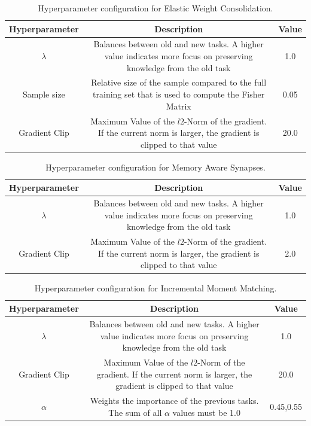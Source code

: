 \begin{table}[h!]
    \begin{tabular}{c | c c } 
        \hline
        Hyperparameter & Description & Value \\ 
        \hline 
        $\lambda$ & Balances between old and new tasks. A higher value indicates more focus
        on preserving knowledge from the old task & 1.0  \\ 
        Sample size & Relative size of the sample compared to the full training set that is used to 
        compute the Fisher Matrix & 0.05  \\ 
        Gradient Clip & Maximum Value of the $l2$-Norm of the gradient. If the current norm is larger, the
        gradient is clipped to that value & 20.0 \\ 
        \hline
    \end{tabular}
    \caption{Hyperparameter configuration for Elastic Weight Consolidation.}
    \label{fig:EWCparams}
\end{table}

\begin{table}[h!]
    \begin{tabular}{c | c c } 
        \hline
        Hyperparameter & Description & Value \\ 
        \hline 
        $\lambda$ & Balances between old and new tasks. A higher value indicates more focus
        on preserving knowledge from the old task & 1.0  \\ 
        Gradient Clip & Maximum Value of the $l2$-Norm of the gradient. If the current norm is larger, the
        gradient is clipped to that value & 2.0 \\ 
        \hline
    \end{tabular}
    \caption{Hyperparameter configuration for Memory Aware Synapses.}
    \label{fig:MASparams}
\end{table}

\begin{table}[h!]
    \begin{tabular}{c | c c } 
        \hline
        Hyperparameter & Description & Value \\ 
        \hline 
        $\lambda$ & Balances between old and new tasks. A higher value indicates more focus
        on preserving knowledge from the old task & 1.0  \\ 
        Gradient Clip & Maximum Value of the $l2$-Norm of the gradient. If the current norm is larger, the
        gradient is clipped to that value & 20.0 \\ 
        $\alpha$ & Weights the importance of the previous tasks. The sum of all $\alpha$ values must be 1.0 & 0.45,0.55 \\
        \hline
    \end{tabular}
    \caption{Hyperparameter configuration for Incremental Moment Matching.}
    \label{fig:IMMparams}
\end{table}

